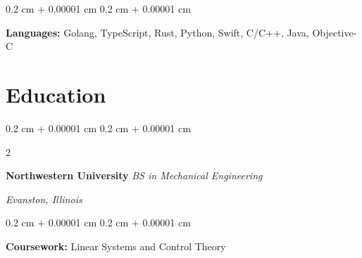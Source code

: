 \documentclass[12pt, letterpaper]{article}
\newenvironment{highlights}{
    \begin{itemize}[
        topsep=0.10 cm,
        parsep=0.10 cm,
        partopsep=0pt,
        itemsep=0pt,
        leftmargin=0.4 cm + 10pt
    ]
}{
    \end{itemize}
} %
\newenvironment{onecolentry}{
    \begin{adjustwidth}{
        0.2 cm + 0.00001 cm
    }{
        0.2 cm + 0.00001 cm
    }
}{
    \end{adjustwidth}
} %
\newenvironment{twocolentry}[2][]{
    \onecolentry
    \def\secondColumn{#2}
    \setcolumnwidth{\fill, 4.5 cm}
    \begin{paracol}{2}
}{
    \switchcolumn \raggedleft \secondColumn
    \end{paracol}
    \endonecolentry
} %
\begin{document}
\vspace{0.2 cm}

\begin{onecolentry}
	\textbf{Languages:} Golang, TypeScript, Rust, Python, Swift,  C/C++, Java, Objective-C
\end{onecolentry}

\vspace{0.2 cm}

\section{Education}
\begin{twocolentry}{
		\textit{Evanston, Illinois}}
	\textbf{Northwestern University}
	\textit{BS in Mechanical Engineering}
\end{twocolentry}

\vspace{0.10 cm}
\begin{onecolentry}
	\textbf{Coursework:} Linear Systems and Control Theory
\end{onecolentry}
\end{document}
